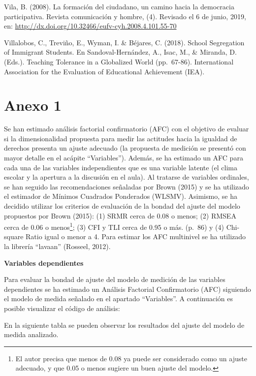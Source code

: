 \documentclass[12pt,twoside]{templates/facsothesis}
\begin{document}
Vila, B. (2008). La formación del ciudadano, un camino hacia la democracia participativa. Revista comunicación y hombre, (4). Revisado el 6 de junio, 2019, en: \url{http://dx.doi.org/10.32466/eufv-cyh.2008.4.101.55-70}

Villalobos, C., Treviño, E., Wyman, I. \& Béjares, C. (2018). School Segregation of Immigrant Students. En Sandoval-Hernández, A., Isac, M., \& Miranda, D. (Eds.). Teaching Tolerance in a Globalized World (pp.~67-86). International Association for the Evaluation of Educational Achievement (IEA).

\hypertarget{anexo-1}{%
\chapter*{Anexo 1}\label{anexo-1}}

Se han estimado análisis factorial confirmatorio (AFC) con el objetivo de evaluar si la dimensionalidad propuesta para medir las actitudes hacia la igualdad de derechos presenta un ajuste adecuado (la propuesta de medición se presentó con mayor detalle en el acápite ``Variables''). Además, se ha estimado un AFC para cada una de las variables independientes que es una variable latente (el clima escolar y la apertura a la discusión en el aula). Al tratarse de variables ordinales, se han seguido las recomendaciones señaladas por Brown (2015) y se ha utilizado el estimador de Mínimos Cuadrados Ponderados (WLSMV). Asimismo, se ha decidido utilizar los criterios de evaluación de la bondad del ajuste del modelo propuestos por Brown (2015): (1) SRMR cerca de 0.08 o menos; (2) RMSEA cerca de 0.06 o menos\footnote{El autor precisa que menos de 0.08 ya puede ser considerado como un ajuste adecuado, y que 0.05 o menos sugiere un buen ajuste del modelo.}; (3) CFI y TLI cerca de 0.95 o más. (p.~86) y (4) Chi-square Ratio igual o menor a 4. Para estimar los AFC multinivel se ha utilizado la librería ``lavaan'' (Rosseel, 2012).

\newpage

\textbf{Variables dependientes}

Para evaluar la bondad de ajuste del modelo de medición de las variables dependientes se ha estimado un Análisis Factorial Confirmatorio (AFC) siguiendo el modelo de medida señalado en el apartado ``Variables''. A continuación es posible visualizar el código de análisis:

En la siguiente tabla se pueden observar los resultados del ajuste del modelo de medida analizado.
\end{document}
